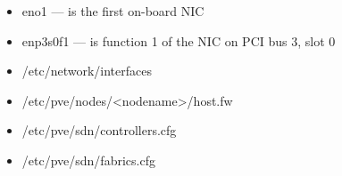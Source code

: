 \begin{itemize}[leftmargin=2cm]

	\item eno1 — is the first on-board NIC

	\item enp3s0f1 — is function 1 of the NIC on PCI bus 3, slot 0

\end{itemize}

\begin{itemize}[leftmargin=2cm]

	\item /etc/network/interfaces

	\item /etc/pve/nodes/<nodename>/host.fw

	\item /etc/pve/sdn/controllers.cfg

	\item /etc/pve/sdn/fabrics.cfg

\end{itemize}


